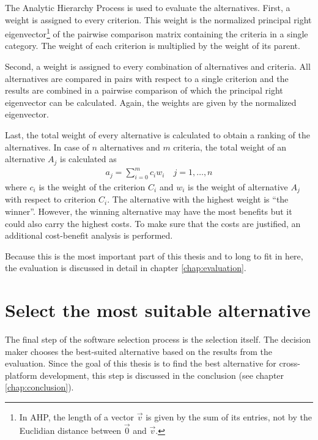 The Analytic Hierarchy Process is used to evaluate the alternatives. First, a weight is assigned to every criterion. This weight is the normalized principal right eigenvector\footnote{In AHP, the length of a vector $\vec{v}$ is given by the sum of its entries, not by the Euclidian distance between $\vec{0}$ and $\vec{v}$.} of the pairwise comparison matrix containing the criteria in a single category. The weight of each criterion is multiplied by the weight of its parent. 

Second, a weight is assigned to every combination of alternatives and criteria. All alternatives are compared in pairs with respect to a single criterion and the results are combined in a pairwise comparison of which the principal right eigenvector can be calculated. Again, the weights are given by the normalized eigenvector.

Last, the total weight of every alternative is calculated to obtain a ranking of the alternatives. In case of $n$ alternatives and $m$ criteria, the total weight of an alternative $A_j$ is calculated as
\begin{gather}
    a_j = \sum_{i = 0}^{m} c_i w_i \quad j = 1, \ldots, n
\end{gather}
where $c_i$ is the weight of the criterion $C_i$ and $w_i$ is the weight of alternative $A_j$ with respect to criterion $C_i$. The alternative with the highest weight is ``the winner''. However, the winning alternative may have the most benefits but it could also carry the highest costs. To make sure that the costs are justified, an additional cost-benefit analysis is performed.

Because this is the most important part of this thesis and to long to fit in here, the evaluation is discussed in detail in chapter \ref{chap:evaluation}.

\section{Select the most suitable alternative}

The final step of the software selection process is the selection itself. The decision maker chooses the best-suited alternative based on the results from the evaluation. Since the goal of this thesis is to find the best alternative for cross-platform development, this step is discussed in the conclusion (see chapter \ref{chap:conclusion}).